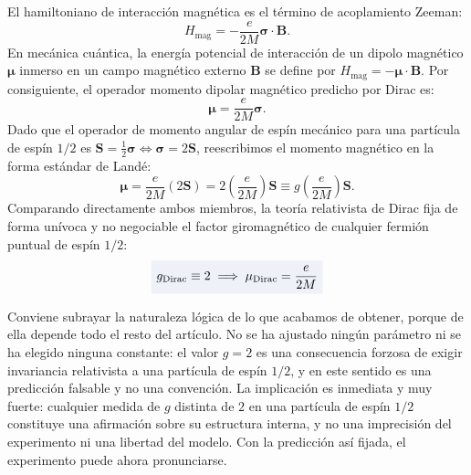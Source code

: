 \documentclass[10pt,a4paper]{article}
\newcommand{\dest}[1]{{\setlength{\fboxsep}{4pt}\colorbox{colordest}{$\displaystyle #1$}}}
\begin{document}
El hamiltoniano de interacción magnética es el término de acoplamiento Zeeman:
\begin{equation}
H_{\text{mag}} = - \frac{e}{2M} \boldsymbol{\sigma} \cdot \mathbf{B}.
\end{equation}
En mecánica cuántica, la energía potencial de interacción de un dipolo magnético $\boldsymbol{\mu}$ inmerso en un campo magnético externo $\mathbf{B}$ se define por $H_{\text{mag}} = - \boldsymbol{\mu} \cdot \mathbf{B}$. Por consiguiente, el operador momento dipolar magnético predicho por Dirac es:
\begin{equation}
\boldsymbol{\mu} = \frac{e}{2M} \boldsymbol{\sigma}.
\end{equation}
Dado que el operador de momento angular de espín mecánico para una partícula de espín $1/2$ es $\mathbf{S} = \frac{1}{2}\boldsymbol{\sigma} \iff \boldsymbol{\sigma} = 2\mathbf{S}$, reescribimos el momento magnético en la forma estándar de Landé:
\begin{equation}
\boldsymbol{\mu} = \frac{e}{2M} (2\mathbf{S}) = 2 \left( \frac{e}{2M} \right) \mathbf{S} \equiv g \left( \frac{e}{2M} \right) \mathbf{S}.
\end{equation}
Comparando directamente ambos miembros, la teoría relativista de Dirac fija de forma unívoca y no negociable el factor giromagnético de cualquier fermión puntual de espín $1/2$:
\begin{equation}
\dest{g_{\text{Dirac}} \equiv 2 \implies \mu_{\text{Dirac}} = \frac{e}{2M}}
\label{eq:g_dirac_exact}
\end{equation}

Conviene subrayar la naturaleza lógica de lo que acabamos de obtener, porque de ella depende todo el resto del artículo. No se ha ajustado ningún parámetro ni se ha elegido ninguna constante: el valor $g = 2$ es una consecuencia forzosa de exigir invariancia relativista a una partícula de espín $1/2$, y en este sentido es una predicción falsable y no una convención. La implicación es inmediata y muy fuerte: cualquier medida de $g$ distinta de $2$ en una partícula de espín $1/2$ constituye una afirmación sobre su estructura interna, y no una imprecisión del experimento ni una libertad del modelo. Con la predicción así fijada, el experimento puede ahora pronunciarse.
\end{document}
